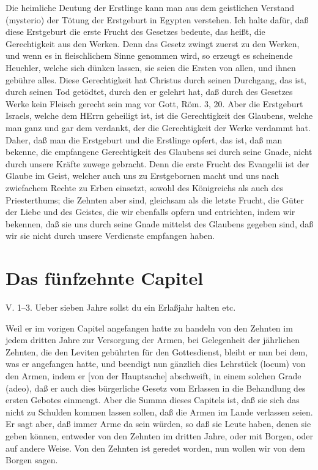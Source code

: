 Die heimliche Deutung der Erstlinge kann man aus dem geistlichen Verstand (mysterio) der Tötung der Erstgeburt in Egypten verstehen. Ich halte dafür, daß diese Erstgeburt die erste Frucht des Gesetzes bedeute, das heißt, die Gerechtigkeit aus den Werken. Denn das Gesetz zwingt zuerst zu den Werken, und wenn es in fleischlichem Sinne genommen wird, so erzeugt es scheinende Heuchler, welche sich dünken lassen, sie seien die Ersten von allen, und ihnen gebühre alles. Diese Gerechtigkeit hat Christus durch seinen Durchgang, das ist, durch seinen Tod getödtet, durch den er gelehrt hat, daß durch des Gesetzes Werke kein Fleisch gerecht sein mag vor Gott, Röm. 3, 20. Aber die Erstgeburt Israels, welche dem HErrn geheiligt ist, ist die Gerechtigkeit des Glaubens, welche man ganz und gar dem verdankt, der die Gerechtigkeit der Werke verdammt hat. Daher, daß man die Erstgeburt und die Erstlinge opfert, das ist, daß man bekenne, die empfangene Gerechtigkeit des Glaubens sei durch seine Gnade, nicht durch unsere Kräfte zuwege gebracht. Denn die erste Frucht des Evangelii ist der Glaube im
Geist, welcher auch uns zu Erstgebornen macht und uns nach zwiefachem Rechte zu Erben einsetzt, sowohl des Königreichs als auch des Priesterthums; die Zehnten aber sind, gleichsam als die letzte Frucht, die Güter der Liebe und des Geistes, die wir ebenfalls opfern und entrichten, indem wir bekennen, daß sie uns durch seine Gnade mittelst des Glaubens gegeben sind, daß wir sie nicht durch unsere Verdienste empfangen haben.

\section{Das fünfzehnte Capitel}

\begin{schriftzitat}
V. 1–3. Ueber sieben Jahre sollst du ein Erlaßjahr halten etc.
\end{schriftzitat}

Weil er im vorigen Capitel angefangen hatte zu handeln von den Zehnten im jedem dritten Jahre zur Versorgung der Armen, bei Gelegenheit der jährlichen Zehnten, die den Leviten gebührten für den Gottesdienst, bleibt er nun bei dem, was er angefangen hatte, und beendigt nun gänzlich dies Lehrstück (locum) von den Armen, indem er [von der Hauptsache] abschweift, in einem solchen Grade (adeo), daß er auch dies bürgerliche Gesetz vom Erlassen in die Behandlung des ersten Gebotes einmengt. Aber die Summa dieses Capitels ist, daß sie sich das nicht zu Schulden kommen lassen sollen, daß die Armen im Lande verlassen seien. Er sagt aber, daß immer Arme da sein würden, so daß sie Leute haben, denen sie geben können, entweder von den Zehnten im dritten Jahre, oder mit Borgen, oder auf andere Weise. Von den Zehnten ist geredet worden, nun wollen wir von dem Borgen sagen.

